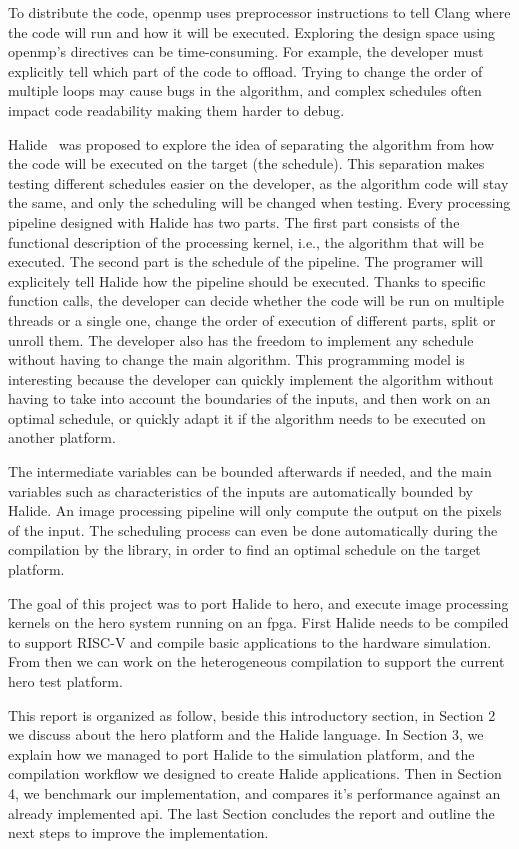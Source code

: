     To distribute the code, \gls{openmp} uses preprocessor instructions to tell Clang where the code will run and how it will be executed. Exploring the design space using \gls{openmp}'s directives can be time-consuming. For example, the developer must explicitly tell which part of the code to offload. Trying to change the order of multiple loops may cause bugs in the algorithm, and complex schedules often impact code readability making them harder to debug.

    Halide~\cite{Art:Halide} was proposed to explore the idea of separating the algorithm from how the code will be executed on the target (the schedule).
    This separation makes testing different schedules easier on the developer, as the algorithm code will stay the same, and only the scheduling will be changed when testing.
    Every processing pipeline designed with Halide has two parts. The first part consists of the functional description of the processing kernel, i.e., the algorithm that will be executed. 
	The second part is the schedule of the pipeline. The programer will explicitely tell Halide how the pipeline should be executed. Thanks to specific function calls, the developer can decide whether the code will be run on multiple threads or a single one, change the order of execution of different parts, split or unroll them. The developer also has the freedom to implement any schedule without having to change the main algorithm.
    This programming model is interesting because the developer can quickly implement the algorithm without having to take into account the boundaries of the inputs, and then work on an optimal schedule, or quickly adapt it if the algorithm needs to be executed on another platform.

    The intermediate variables can be bounded afterwards if needed, and the main variables such as characteristics of the inputs are automatically bounded by Halide. An image processing pipeline will only compute the output on the pixels of the input.
    The scheduling process can even be done automatically during the compilation by the library, in order to find an optimal schedule on the target platform.

	The goal of this project was to port Halide to \gls{hero}, and execute image processing kernels on the \gls{hero} system running on an \gls{fpga}. First Halide needs to be compiled to support RISC-V and compile basic applications to the hardware simulation. From then we can work on the heterogeneous compilation to support the current \gls{hero} test platform.


	This report is organized as follow, beside this introductory section, in Section 2 we discuss about the \gls{hero} platform and the Halide language. In Section 3, we explain how we managed to port Halide to the simulation platform, and the compilation workflow we designed to create Halide applications. Then in Section 4, we benchmark our implementation, and compares it's performance against an already implemented \gls{api}. The last Section concludes the report and outline the next steps to improve the implementation.

